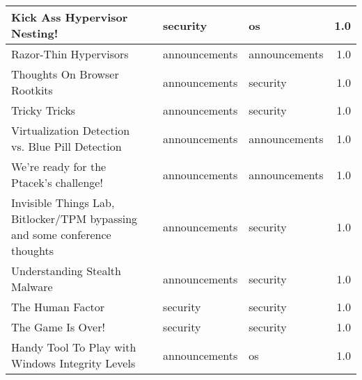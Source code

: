 \begin{small}
\begin{longtable}{|p{5cm}|l|l|l|r|}
Kick Ass Hypervisor Nesting!&  &security&os&1.0\\ \hline 
Razor-Thin Hypervisors&  &announcements&announcements&1.0\\ \hline 
Thoughts On Browser Rootkits&  &announcements&security&1.0\\ \hline 
Tricky Tricks&  &announcements&security&1.0\\ \hline 
Virtualization Detection vs. Blue Pill Detection&  &announcements&announcements&1.0\\ \hline 
We're ready for the Ptacek's challenge!&  &announcements&announcements&1.0\\ \hline 
Invisible Things Lab, Bitlocker/TPM bypassing and some conference thoughts&  &announcements&security&1.0\\ \hline 
Understanding Stealth Malware&  &announcements&security&1.0\\ \hline 
The Human Factor&  &security&security&1.0\\ \hline 
The Game Is Over!&  &security&security&1.0\\ \hline 
Handy Tool To Play with Windows Integrity Levels&  &announcements&os&1.0\\ \hline 

\end{longtable}
\end{small}